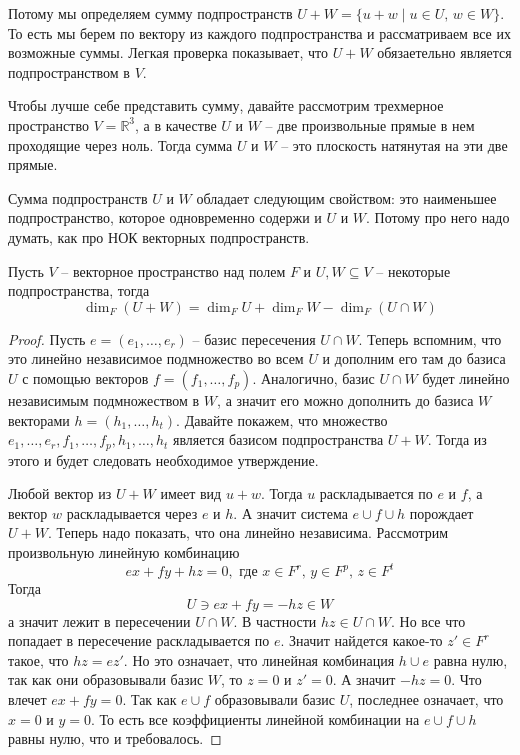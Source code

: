 Потому мы определяем сумму подпространств $U + W = \{u + w\mid u\in U,\, w\in W\}$. То есть мы берем по вектору из каждого подпространства и рассматриваем все их возможные суммы. Легкая проверка показывает, что $U+W$ обязаетельно является подпространством в $V$.

Чтобы лучше себе представить сумму, давайте рассмотрим трехмерное пространство $V = \mathbb R^3$, а в качестве $U$ и $W$ -- две произвольные прямые в нем проходящие через ноль. Тогда сумма $U$ и $W$ -- это плоскость натянутая на эти две прямые.

Сумма подпространств $U$ и $W$ обладает следующим свойством: это наименьшее подпространство, которое одновременно содержи и $U$ и $W$. Потому про него надо думать, как про НОК векторных подпространств.

\begin{claim}
Пусть $V$ -- векторное пространство над полем $F$ и $U,W\subseteq V$ -- некоторые подпространства, тогда 
\[
\dim_F (U + W) = \dim_F U + \dim_F W - \dim_F (U\cap W)
\]
\end{claim}
\begin{proof}
Пусть $e=(e_1,\ldots,e_r)$ -- базис пересечения $U\cap W$. Теперь вспомним, что это линейно независимое подмножество во всем $U$ и дополним его там до базиса $U$ с помощью векторов $f=(f_1,\ldots, f_p)$. Аналогично, базис $U\cap W$ будет линейно независимым подмножеством в $W$, а значит его можно дополнить до базиса $W$ векторами $h=(h_1,\ldots,h_t)$. Давайте покажем, что множество $e_1,\ldots,e_r, f_1,\ldots,f_p,h_1,\ldots,h_t$ является базисом подпространства $U + W$. Тогда из этого и будет следовать необходимое утверждение.

Любой вектор из $U+W$ имеет вид $u+w$. Тогда $u$ раскладывается по $e$ и $f$, а вектор $w$ раскладывается через $e$ и $h$. А значит система $e\cup f\cup h$ порождает $U + W$. Теперь надо показать, что она линейно независима. Рассмотрим произвольную линейную комбинацию
\[
e x + fy + hz = 0, \text{ где }x\in F^r,\, y\in F^p,\, z\in F^t
\]
Тогда
\[
U \ni ex +fy = -hz \in W
\]
а значит лежит в пересечении $U\cap W$. В частности $hz \in U\cap W$. Но все что попадает в пересечение раскладывается по $e$. Значит найдется какое-то $z'\in F^r$ такое, что $hz = ez'$. Но это означает, что линейная комбинация $h\cup e$ равна нулю, так как они образовывали базис $W$, то $z =0$ и $z' = 0$. А значит $-hz = 0$. Что влечет $ex + fy = 0$. Так как $e \cup f$ образовывали базис $U$, последнее означает, что $x = 0$ и $y = 0$. То есть все коэффициенты линейной комбинации на $e\cup f\cup h$ равны нулю, что и требовалось.
\end{proof}

